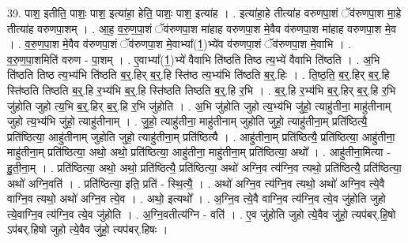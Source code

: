 \documentclass[17pt]{extarticle}
\begin{document}
39. पाश॒ इतीति॒ पाशः॒ पाश॒ इत्या॑हा॒ हेति॒ पाशः॒ पाश॒ इत्या॑ह । . इत्या॑हा॒हे तीत्या॑ह वरुणपा॒शं ॅव॑रुणपा॒श मा॒हे तीत्या॑ह वरुणपा॒शम् । . आ॒ह॒ व॒रु॒ण॒पा॒शं ॅव॑रुणपा॒श मा॑हाह वरुणपा॒श मे॒वैव व॑रुणपा॒श मा॑हाह वरुणपा॒श मे॒व । . व॒रु॒ण॒पा॒श मे॒वैव व॑रुणपा॒शं ॅव॑रुणपा॒श मे॒वाभ्या᳚(1॒)भ्ये॑व व॑रुणपा॒शं ॅव॑रुणपा॒श मे॒वाभि । . व॒रु॒ण॒पा॒शमिति॑ वरुण - पा॒शम् । . ए॒वाभ्या᳚(1॒)भ्ये॑ वैवाभि ति॑ष्ठति तिष्ठ त्य॒भ्ये॑ वैवाभि ति॑ष्ठति । . अ॒भि ति॑ष्ठति तिष्ठ त्य॒भ्य॑भि ति॑ष्ठति ब॒र्॒.हिर् ब॒र्॒.हि स्ति॑ष्ठ त्य॒भ्य॑भि ति॑ष्ठति ब॒र्॒.हिः । . ति॒ष्ठ॒ति॒ ब॒र्॒.हिर् ब॒र्॒.हि स्ति॑ष्ठति तिष्ठति ब॒र्॒.हि र॒भ्य॑भि ब॒र्॒.हि स्ति॑ष्ठति तिष्ठति ब॒र्॒.हि र॒भि । . ब॒र्॒.हि र॒भ्य॑भि ब॒र्॒.हिर् ब॒र्॒.हि र॒भि जु॑होति जुहो त्य॒भि ब॒र्॒.हिर् ब॒र्॒.हि र॒भि जु॑होति । . अ॒भि जु॑होति जुहो त्य॒भ्य॑भि जु॑हो॒ त्याहु॑तीना॒ माहु॑तीनाम् जुहो त्य॒भ्य॑भि जु॑हो॒ त्याहु॑तीनाम् । . जु॒हो॒ त्याहु॑तीना॒ माहु॑तीनाम् जुहोति जुहो॒ त्याहु॑तीना॒म् प्रति॑ष्ठित्यै॒ प्रति॑ष्ठित्या॒ आहु॑तीनाम् जुहोति जुहो॒ त्याहु॑तीना॒म् प्रति॑ष्ठित्यै । . आहु॑तीना॒म् प्रति॑ष्ठित्यै॒ प्रति॑ष्ठित्या॒ आहु॑तीना॒ माहु॑तीना॒म् प्रति॑ष्ठित्या॒ अथो॒ अथो॒ प्रति॑ष्ठित्या॒ आहु॑तीना॒ माहु॑तीना॒म् प्रति॑ष्ठित्या॒ अथो᳚ । . आहु॑तीना॒मित्या - हु॒ती॒ना॒म् । . प्रति॑ष्ठित्या॒ अथो॒ अथो॒ प्रति॑ष्ठित्यै॒ प्रति॑ष्ठित्या॒ अथो॑ अग्नि॒व त्य॑ग्नि॒व त्यथो॒ प्रति॑ष्ठित्यै॒ प्रति॑ष्ठित्या॒ अथो॑ अग्नि॒वति॑ । . प्रति॑ष्ठित्या॒ इति॒ प्रति॑ - स्थि॒त्यै॒ । . अथो॑ अग्नि॒व त्य॑ग्नि॒व त्यथो॒ अथो॑ अग्नि॒व त्ये॒वै वाग्नि॒व त्यथो॒ अथो॑ अग्नि॒व त्ये॒व । . अथो॒ इत्यथो᳚ । . अ॒ग्नि॒व त्ये॒वै वाग्नि॒व त्य॑ग्नि॒व त्ये॒व जु॑होति जुहो त्ये॒वाग्नि॒व त्य॑ग्नि॒व त्ये॒व जु॑होति । . अ॒ग्नि॒वतीत्य॑ग्नि - वति॑ । . ए॒व जु॑होति जुहो त्ये॒वैव जु॑हो॒ त्यप॑बर्.हि॒षो ऽप॑बर्.हिषो जुहो त्ये॒वैव जु॑हो॒ त्यप॑बर्.हिषः । \newline
\end{document}
